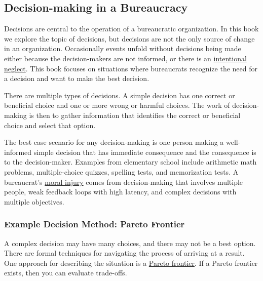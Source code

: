 \subsection*{Decision-making in a Bureaucracy\label{sec:decision-making}}

Decisions are central to the operation of a bureaucratic organization. In this book we explore the topic of decisions, but decisions are not the only source of change in an organization. Occasionally events unfold without decisions being made either because the decision-makers are not informed, or there is an \href{https://en.wikipedia.org/wiki/Willful_blindness}{intentional neglect}. 
This book focuses on situations where bureaucrats recognize the need for a decision and want to make the best decision.

There are multiple types of decisions. 
A \gls{simple decision} 
has one correct or beneficial choice and one or more wrong or harmful choices. The work of decision-making is then to gather information that identifies the correct or beneficial choice and select that option.

The best case scenario for any decision-making is one person making a well-informed simple decision that has immediate consequence and the consequence is to the decision-maker. Examples from elementary school include arithmetic math problems, multiple-choice quizzes, spelling tests, and memorization tests. A bureaucrat's \href{https://en.wikipedia.org/wiki/Moral_injury}{moral injury}
comes from decision-making that involves multiple people, weak feedback loops with high latency, and complex decisions with multiple objectives.

\subsubsection{Example Decision Method: Pareto Frontier\label{sec:pareto}}

A complex decision may have many choices, and there may not be a best option. There are formal techniques for navigating the process of arriving at a result. One approach for describing the situation is a \href{https://en.wikipedia.org/wiki/Pareto_front}{Pareto frontier}. 
If a Pareto frontier exists, then you can evaluate trade-offs. 

